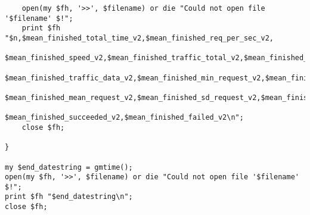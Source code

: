 \begin{lstlisting}
	open(my $fh, '>>', $filename) or die "Could not open file '$filename' $!";
    print $fh "$n,$mean_finished_total_time_v2,$mean_finished_req_per_sec_v2,
    			$mean_finished_speed_v2,$mean_finished_traffic_total_v2,$mean_finished_traffic_header_v2,
    			$mean_finished_traffic_data_v2,$mean_finished_min_request_v2,$mean_finished_max_request_v2,
    			$mean_finished_mean_request_v2,$mean_finished_sd_request_v2,$mean_finished_sd_percent_request_v2,
    			$mean_finished_succeeded_v2,$mean_finished_failed_v2\n";
    close $fh;
		
}			

my $end_datestring = gmtime();
open(my $fh, '>>', $filename) or die "Could not open file '$filename' $!";
print $fh "$end_datestring\n";
close $fh;

			
\end{lstlisting}